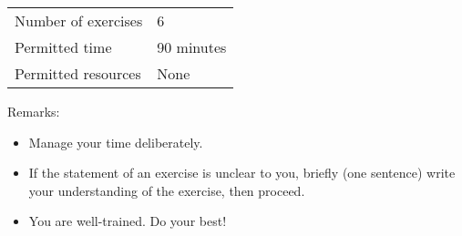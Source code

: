 \begin{center}
\begin{tabular}{l@{ : }l}
Number of exercises	&	6			\\
Permitted time		&	90 minutes	\\
Permitted resources	&	None
\end{tabular}
\end{center}
\vspace{.25in}
\noindent{}Remarks:
\begin{itemize}
\item Manage your time deliberately.
\item If the statement of an exercise is unclear to you, briefly (one sentence) write your understanding of the exercise, then proceed.
\item You are well-trained. Do your best!
\end{itemize}